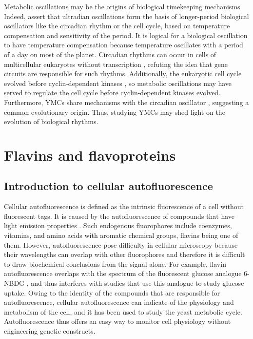 Metabolic oscillations may be the origins of biological timekeeping mechanisms.
Indeed, \citet{lloydRedoxRhythmicityClocks2007} assert that ultradian oscillations form the basis of longer-period biological oscillators like the circadian rhythm or the cell cycle, based on temperature compensation and sensitivity of the period.
It is logical for a biological oscillation to have temperature compensation because temperature oscillates with a period of a day on most of the planet.
Circadian rhythms can occur in cells of multicellular eukaryotes without transcription \citep{oneillCircadianRhythmsPersist2011}, refuting the idea that gene circuits are responsible for such rhythms.
Additionally, the eukaryotic cell cycle evolved before cyclin-dependent kinases \citep{papagiannakisAutonomousMetabolicOscillations2017}, so metabolic oscillations may have served to regulate the cell cycle before cyclin-dependent kinases evolved.
Furthermore, YMCs share mechanisms with the circadian oscillator \citep{caustonMetabolicCyclesYeast2015,arataQuantitativeStudiesCellDivision2019}, suggesting a common evolutionary origin.
Thus, studying YMCs may shed light on the evolution of biological rhythms.

\section{Flavins and flavoproteins}
\label{sec:intro-flavin}

\subsection{Introduction to cellular autofluorescence}
\label{subsec:intro-flavin-autofluo}

Cellular autofluorescence is defined as the intrinsic fluorescence of a cell without fluorescent tags.
It is caused by the autofluorescence of compounds that have light emission properties \parencite{maslankaAutofluorescenceYeastSaccharomyces2018}.
Such endogenous fluorophores include coenzymes, vitamins, and amino acids with aromatic chemical groups, flavins being one of them.
However, autofluorescence pose difficulty in cellular microscopy because their wavelengths can overlap with other fluorophores and therefore it is difficult to draw biochemical conclusions from the signal alone.
For example, flavin autofluorescence overlaps with the spectrum of the fluorescent glucose analogue 6-NBDG \parencite{maslankaAutofluorescenceYeastSaccharomyces2018}, and thus interferes with studies that use this analogue to study glucose uptake.
Owing to the identity of the compounds that are responsible for autofluorescence, cellular autofluorescence can indicate of the physiology and metabolism of the cell, and it has been used to study the yeast metabolic cycle.
Autofluorescence thus offers an easy way to monitor cell physiology without engineering genetic constructs.

